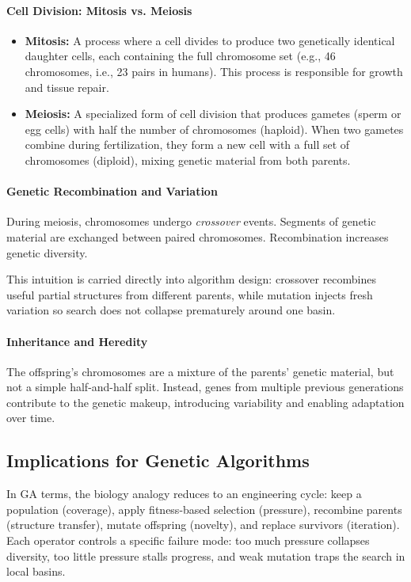 \paragraph{Cell Division: Mitosis vs. Meiosis}
\begin{itemize}
    \item \textbf{Mitosis:} A process where a cell divides to produce two genetically identical daughter cells, each containing the full chromosome set (e.g., 46 chromosomes, i.e., 23 pairs in humans). This process is responsible for growth and tissue repair.
    \item \textbf{Meiosis:} A specialized form of cell division that produces gametes (sperm or egg cells) with half the number of chromosomes (haploid). When two gametes combine during fertilization, they form a new cell with a full set of chromosomes (diploid), mixing genetic material from both parents.
\end{itemize}

\paragraph{Genetic Recombination and Variation}
\begin{sloppypar}
During meiosis, chromosomes undergo \emph{crossover} events. Segments of genetic material are exchanged between paired chromosomes. Recombination increases genetic diversity.
\end{sloppypar}
This intuition is carried directly into algorithm design: crossover recombines useful partial structures from different parents, while mutation injects fresh variation so search does not collapse prematurely around one basin.

\paragraph{Inheritance and Heredity}
The offspring's chromosomes are a mixture of the parents' genetic material, but not a simple half-and-half split. Instead, genes from multiple previous generations contribute to the genetic makeup, introducing variability and enabling adaptation over time.

\subsection{Implications for Genetic Algorithms}
\label{sec:evo_implications_for_genetic_algorithms}

In GA terms, the biology analogy reduces to an engineering cycle: keep a population (coverage), apply fitness-based selection (pressure), recombine parents (structure transfer), mutate offspring (novelty), and replace survivors (iteration). Each operator controls a specific failure mode: too much pressure collapses diversity, too little pressure stalls progress, and weak mutation traps the search in local basins.

